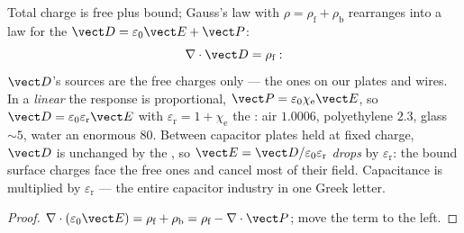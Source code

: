 \begin{proposition}\label{prop:b3:electromagnetism-in-matter:displacement}
Total charge is free plus bound; Gauss's law with $\rho =
\rho_{\text{f}} + \rho_{\text{b}}$ rearranges into a law for the
\emph{} $\vect D = \varepsilon_0\vect E +
\vect P$:
\[
\nabla\cdot\vect D = \rho_{\text{f}} :
\]
$\vect D$'s sources are the free charges only --- the ones on our
plates and wires. In a \emph{linear}  the response is
proportional, $\vect P = \varepsilon_0\chi_{\text{e}}\vect E$, so
$\vect D = \varepsilon_0\varepsilon_{\text{r}}\vect E$ with
$\varepsilon_{\text{r}} = 1 + \chi_{\text{e}}$ the \emph{}: air $1.0006$, polyethylene $2.3$, glass $\sim 5$,
water an enormous $80$. Between capacitor plates held at fixed
charge, $\vect D$ is unchanged by the , so $\vect E =
\vect D/\varepsilon_0\varepsilon_{\text{r}}$ \emph{drops} by
$\varepsilon_{\text{r}}$: the bound surface charges face the free
ones and cancel most of their field. Capacitance is multiplied by
$\varepsilon_{\text{r}}$ --- the entire capacitor industry in one
Greek letter.
\end{proposition}

\begin{proof}
$\nabla\cdot(\varepsilon_0\vect E) = \rho_{\text{f}} +
\rho_{\text{b}} = \rho_{\text{f}} - \nabla\cdot\vect P$; move the
 term to the left.
\end{proof}

